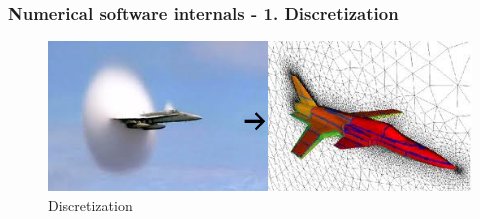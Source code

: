 \documentclass{beamer}
\begin{document}
\begin{frame}
\large
\frametitle{Numerical software internals - 1. Discretization}
\begin{figure}[!ht]
\vspace{-1mm}
\begin{center}
\includegraphics[width=1.0\textwidth]{Discretization.png}
\caption{Discretization}
\end{center}
\noindent
\vspace{-4mm}
\end{figure}
\end{frame}
\end{document}
